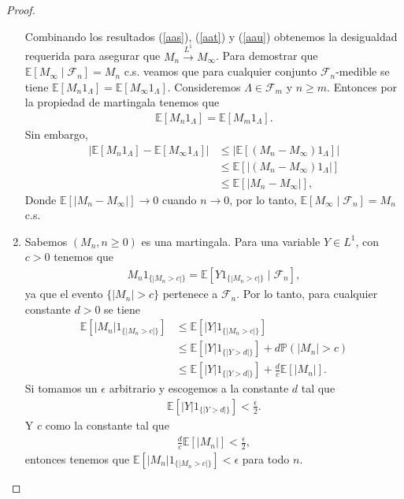 \begin{proof}
\begin{enumerate}
Combinando los resultados (\ref{aas}), (\ref{aat}) y (\ref{aau}) obtenemos la desigualdad requerida para asegurar que $M_n \xrightarrow{L^1} M_{\infty}$. Para demostrar que $\mathbb{E}\left[M_{\infty} \mid \mathcal{F}_n\right] = M_n$ c.s. veamos que para cualquier conjunto $\mathcal{F}_n$-medible se tiene $\mathbb{E}[M_n 1_{\Lambda}] = \mathbb{E}[M_{\infty} 1_{\Lambda}]$. Consideremos $\Lambda \in \mathcal{F}_m$ y $n \geq m$. Entonces por la propiedad de martingala tenemos que
	\begin{align*}
	\mathbb{E}[M_n 1_{\Lambda}] = \mathbb{E}[M_m 1_{\Lambda}].
	\end{align*}
Sin embargo, 
	\begin{align*}
	|\mathbb{E}[M_n 1_{\Lambda}] - \mathbb{E}[M_{\infty} 1_{\Lambda}]| & \leq |\mathbb{E}[(M_n - M_{\infty}) 1_{\Lambda}]| \\
	& \leq \mathbb{E}[|(M_n - M_{\infty}) 1_{\Lambda}|] \\
	& \leq \mathbb{E}[|M_n - M_{\infty}|],
	\end{align*}
Donde $\mathbb{E}[|M_n - M_{\infty}|] \rightarrow 0$ cuando $n \rightarrow 0$, por lo tanto, $\mathbb{E}[M_{\infty} \mid \mathcal{F}_n] = M_n$ c.s.

\item Sabemos $(M_n, n \geq 0)$ es una martingala. Para una variable $Y \in L^1$, con $c > 0$ tenemos que
	\begin{align*}
	M_n 1_{\{|M_n > c|\}} = \mathbb{E}\left[Y1_{\{|M_n > c|\}} \mid \mathcal{F}_n\right],
	\end{align*}
ya que el evento $\{|M_n| > c\}$ pertenece a $\mathcal{F}_n$. Por lo tanto, para cualquier constante $d > 0$ se tiene
	\begin{align*}
	\mathbb{E}\left[|M_n| 1_{\{|M_n > c|\}}\right] & \leq \mathbb{E}\left[|Y|1_{\{|M_n > c|\}}\right] \\
	& \leq \mathbb{E}\left[|Y|1_{\{|Y > d|\}} \right] + d\mathbb{P}(|M_n| > c) \\
	& \leq \mathbb{E}\left[|Y|1_{\{|Y > d|\}} \right] + \frac{d}{c}\mathbb{E}[|M_n|].
	\end{align*}
Si tomamos un $\epsilon$ arbitrario y escogemos a la constante $d$ tal que 
	\begin{align*}
	\mathbb{E}\left[|Y|1_{\{|Y > d|\}}\right] < \frac{\epsilon}{2}.
	\end{align*}
Y $c$ como la constante tal que 
	\begin{align*}
	\frac{d}{c} \mathbb{E}[|M_n|] < \frac{\epsilon}{2},
	\end{align*}
	entonces tenemos que $\mathbb{E}[|M_n| 1_{\{|M_n > c|\}}] < \epsilon$ para todo $n$.
\end{enumerate}
\end{proof}


